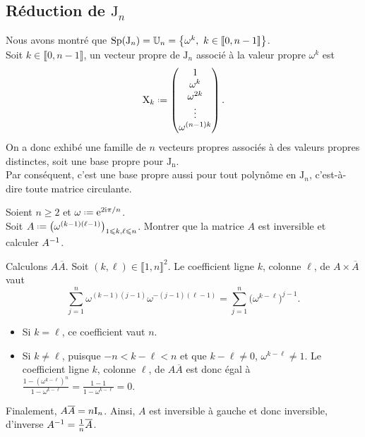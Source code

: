 \subsection{Réduction de \texorpdfstring{$\mathrm{J}_n$}{J_n}}

Nous avons montré que $\mathrm{Sp}(\mathrm{J}_n) = \mathbb{U}_n = \left \{ \omega^k,\ k \in \llbracket 0, n-1 \rrbracket \right \}$. \\
Soit $k \in \llbracket 0, n-1 \rrbracket$, un vecteur propre de $\mathrm{J}_n$ associé à la valeur propre $\omega^k$ est
$$
\mathrm{X}_k \defeq
\begin{pmatrix}
    1 \\
    \omega^k \\
    \omega^{2k} \\
    \vdots \\
    \omega^{(n-1)k}
\end{pmatrix}.
$$
On a donc exhibé une famille de $n$ vecteurs propres associés à des valeurs propres distinctes, soit une base propre pour $\mathrm{J_n}$. \\
Par conséquent, c'est une base propre aussi pour tout polynôme en $\mathrm{J}_n$, c'est-à-dire toute matrice circulante.

\begin{exercice}
    Soient $n \geqslant 2$ et $\omega \defeq \me^{2 \mi \pi / n}$. \\
    Soit $A \defeq \big( \omega^{(k-1)(\ell-1)} \big)_{1 \leqslant k, \ell \leqslant n}$. Montrer que la matrice $A$ est inversible et calculer $A^{-1}$.
\end{exercice}

\begin{solution}
    Calculons $A \overline{A}$. Soit $(k, \ell) \in \llbracket 1, n \rrbracket^2$. Le coefficient ligne $k$, colonne $\ell$, de $A \times \overline{A}$ vaut
    $$\sum_{j=1}^n \omega^{(k-1)(j-1)} \omega^{-(j-1)(\ell-1)} = \sum_{j=1}^n \big( \omega^{k-\ell} \big)^{j-1}.$$
    \begin{itemize}
        \item Si $k = \ell$, ce coefficient vaut $n$.
        \item Si $k \not= \ell$, puisque $-n < k-\ell < n$ et que $k - \ell \not= 0$, $\omega^{k-\ell} \not=1$. Le coefficient ligne $k$, colonne $\ell$, de $A \overline{A}$ est donc égal à $\frac{1 - (\omega^{k-\ell})^n}{1 - \omega^{k-\ell}} = \frac{1-1}{1 - \omega^{k-\ell}} = 0$.
    \end{itemize}
    Finalement, $A \overline{A} = n \mathrm{I}_n$. Ainsi, $A$ est inversible à gauche et donc inversible, d'inverse $A^{-1} = \frac{1}{n}\overline{A}$.
\end{solution}
